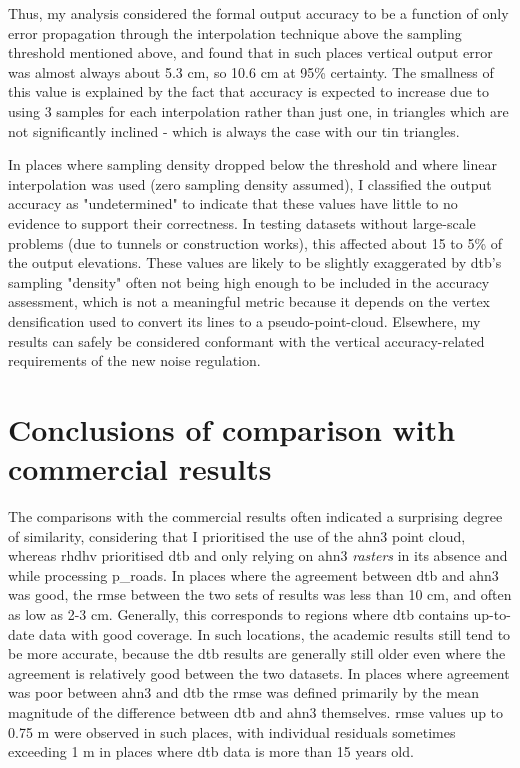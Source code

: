Thus, my analysis considered the formal output accuracy to be a function of only error propagation through the interpolation technique above the sampling threshold mentioned above, and found that in such places vertical output error was almost always about 5.3 cm, so 10.6 cm at 95\% certainty. The smallness of this value is explained by the fact that accuracy is expected to increase due to using 3 samples for each interpolation rather than just one, in triangles which are not significantly inclined - which is always the case with our \ac{tin} triangles.

In places where sampling density dropped below the threshold and where linear interpolation was used (zero sampling density assumed), I classified the output accuracy as "undetermined" to indicate that these values have little to no evidence to support their correctness. In testing datasets without large-scale problems (due to tunnels or construction works), this affected about 15 to 5\% of the output elevations. These values are likely to be slightly exaggerated by \ac{dtb}'s sampling "density" often not being high enough to be included in the accuracy assessment, which is not a meaningful metric because it depends on the vertex densification used to convert its lines to a pseudo-point-cloud. Elsewhere, my results can safely be considered conformant with the vertical accuracy-related requirements of the new noise regulation.

\section{Conclusions of comparison with commercial results}
\label{sec:conclusionscomparison}

The comparisons with the commercial results often indicated a surprising degree of similarity, considering that I prioritised the use of the \ac{ahn3} point cloud, whereas \ac{rhdhv} prioritised \ac{dtb} and only relying on \ac{ahn3} \textit{rasters} in its absence and while processing \ac{p_roads}. In places where the agreement between \ac{dtb} and \ac{ahn3} was good, the \ac{rmse} between the two sets of results was less than 10 cm, and often as low as 2-3 cm. Generally, this corresponds to regions where \ac{dtb} contains up-to-date data with good coverage. In such locations, the academic results still tend to be more accurate, because the \ac{dtb} results are generally still older even where the agreement is relatively good between the two datasets. In places where agreement was poor between \ac{ahn3} and \ac{dtb} the \ac{rmse} was defined primarily by the mean magnitude of the difference between \ac{dtb} and \ac{ahn3} themselves. \ac{rmse} values up to 0.75 m were observed in such places, with individual residuals sometimes exceeding 1 m in places where \ac{dtb} data is more than 15 years old.

